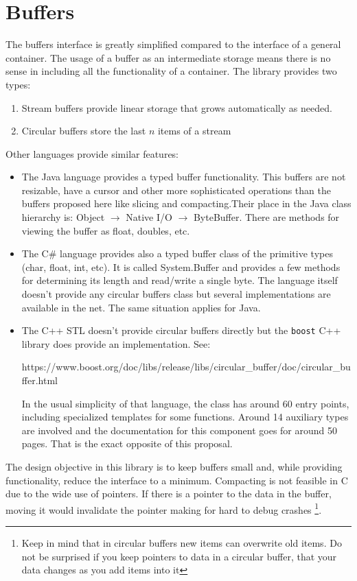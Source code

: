 \documentclass[12pt,a4paper,openany]{memoir} %
\newcommand{\container}{}
\begin{document}
{{%
\newpage
\section{Buffers}
\renewcommand{\container}{Buffers}
The buffers interface is greatly simplified compared to the interface of a general container. 
The usage of a buffer as an intermediate storage means there is no sense in including all  the functionality of a container. The library provides two 
types:
\begin{enumerate}
\item Stream buffers provide linear storage that grows automatically as needed.
\item Circular buffers store the last $n$ items of a stream
\end{enumerate}
Other languages provide similar features:
\begin{itemize}
\item The Java language provides a typed buffer functionality. This buffers are not resizable, have a cursor and other more sophisticated operations 
than the buffers proposed here like slicing and compacting.Their place in the Java class hierarchy is: Object $\rightarrow$ Native I/O $\rightarrow$ 
ByteBuffer. There are methods for viewing the buffer as float, doubles, etc. 

\item The C\# language provides also a typed buffer class of the primitive types (char, float, int, etc). It is called System.Buffer and provides a few 
methods for determining its length and read/write a single byte. The language itself doesn't provide any circular buffers class but several 
implementations are available in the net. The same situation applies for Java.
\item The C++ STL doesn't provide circular buffers directly but the \texttt{boost} C++ library does provide an implementation. See:
\par
{\small
https://www.boost.org/doc/libs/release/libs/circular\_buffer/doc/circular\_buffer.html}
\par
In the usual simplicity of that language, the class has around 60 entry points, including specialized templates for some functions. Around 14 auxiliary 
types are involved and the documentation for this component goes for around 50 pages. That is the exact opposite of this proposal.
\end{itemize}
The design objective in this library is to keep buffers small and, while providing functionality, reduce the interface to a minimum. Compacting is not 
feasible in C due to the wide use of pointers. If there is a pointer to the data in the buffer, moving it would invalidate the pointer making for hard 
to debug crashes \footnote{Keep in mind that in circular buffers new items can overwrite old items. Do not be surprised if you keep pointers to data in 
a circular buffer, that your data changes as you add items into it}.

}}
\end{document}
